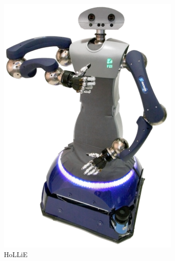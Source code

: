 \begin{figure}[hbtp]
\begin{subfigure}[t]{0.28\textwidth}
		\includegraphics[width=\textwidth]{04_images/robots/HoLLiE.png}
		\caption{HoLLiE}
		\label{subfig:HoLLiE}
	\end{subfigure}
	\begin{subfigure}[t]{0.29\textwidth}

\end{subfigure}
\end{figure}
